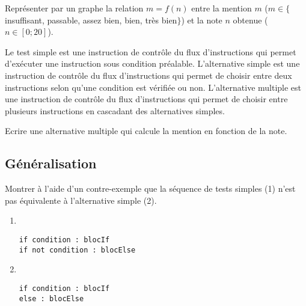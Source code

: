 \begin{question} Représenter par un graphe la relation 
$m = f(n)$
entre la mention $m$ ($m \in \{$insuffisant, passable, assez bien, bien, très bien$\}$) 
et la note $n$ obtenue ($n \in [0;20]$).
\end{question}

Le test simple est une instruction de contrôle du flux d'instructions 
qui permet d'exécuter une instruction sous condition préalable.
L'alternative simple est une instruction de contrôle du flux d'instructions 
qui permet de choisir entre deux instructions selon qu'une condition est vérifiée ou non.
L'alternative multiple est une instruction de contrôle du flux d'instructions 
qui permet de choisir entre plusieurs instructions en cascadant des alternatives simples.

\begin{question} Ecrire une alternative multiple
qui calcule la mention en fonction de la note.
\end{question}


\subsection{Généralisation}
\begin{question}
Montrer à l'aide d'un contre-exemple que la séquence de tests simples (1)
n'est pas équivalente à l'alternative simple (2).

\noindent\begin{minipage}[t]{6cm}\footnotesize
\begin{enumerate}
\item \tt
\begin{Verbatim}
if condition : blocIf
if not condition : blocElse
\end{Verbatim}
\end{enumerate}
\end{minipage}
\hfill
\begin{minipage}[t]{6cm}\footnotesize
\begin{enumerate}\setcounter{enumi}{1}
\item \tt
\begin{Verbatim}
if condition : blocIf
else : blocElse
\end{Verbatim}
\end{enumerate}
\end{minipage}
\end{question}

